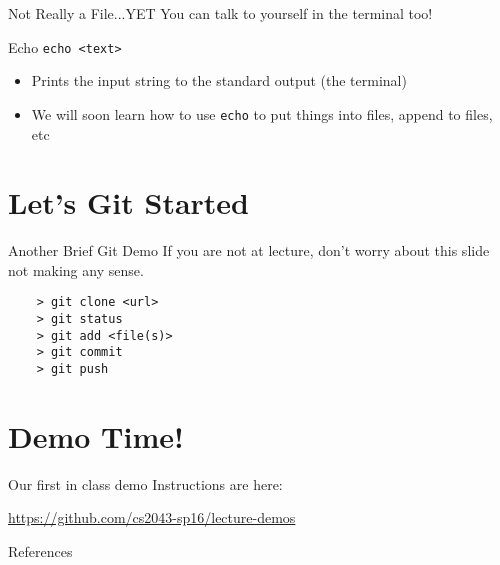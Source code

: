 \documentclass[11pt]{beamer}
\newcommand{\colbf}[1]{\textcolor{mLightBrown!77!black}{#1}}%
\def\wl{\par \vspace{\baselineskip}}                        %
\begin{document}
\begin{frame}[fragile]{Not Really a File...YET}
  You can talk to yourself in the terminal too!

  \begin{block}{\colbf{Echo}}
    \texttt{echo <text>}
    \begin{itemize}
      \item Prints the input string to the standard output (the terminal)
      \item We will soon learn how to use \texttt{echo} to put things into files, append to files, etc
    \end{itemize}
  \end{block}
\end{frame}
%

%
\section{Let's Git Started}
\label{sec:let_s_git_started}

\begin{frame}[fragile]{Another Brief Git Demo}
  If you are not at lecture, don't worry about this slide not making any sense.\wl

  \begin{verbatim}
    > git clone <url>
    > git status
    > git add <file(s)>
    > git commit
    > git push
  \end{verbatim}
\end{frame}

%

%
\section{Demo Time!}
\label{sec:demo_time_}
\begin{frame}[fragile]{Our first in class demo}
  Instructions are here:\wl

  \href{https://github.com/cs2043-sp16/lecture-demos}{https://github.com/cs2043-sp16/lecture-demos}
\end{frame}
%

\begin{frame}[allowframebreaks]{References}
  
  
\end{frame}
\end{document}
